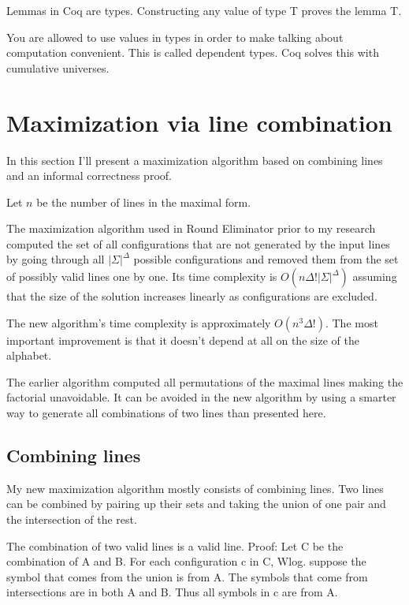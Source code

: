 \documentclass[english, 12pt, a4paper, sci, utf8, a-1b, online]{aaltothesis}
\begin{document}
Lemmas in Coq are types. Constructing any value of type T proves the lemma T.

You are allowed to use values in types in order to make talking about computation convenient. This is called dependent types. Coq solves this with cumulative universes.


\section{Maximization via line combination}

In this section I'll present a maximization algorithm based on combining lines and an informal correctness proof.

Let $n$ be the number of lines in the maximal form.

The maximization algorithm used in Round Eliminator prior to my research computed the set of all configurations that are not generated by the input lines by going through all $|\Sigma|^{\Delta}$ possible configurations and removed them from the set of possibly valid lines one by one. Its time complexity is $O(n\Delta!|\Sigma|^{\Delta})$ assuming that the size of the solution increases linearly as configurations are excluded.

The new algorithm's time complexity is approximately $O(n^{3}\Delta!)$. The most important improvement is that it doesn't depend at all on the size of the alphabet.

The earlier algorithm computed all permutations of the maximal lines making the factorial unavoidable. It can be avoided in the new algorithm by using a smarter way to generate all combinations of two lines than presented here. %

\subsection{Combining lines}

My new maximization algorithm mostly consists of combining lines. Two lines can be combined by pairing up their sets and taking the union of one pair and the intersection of the rest.

The combination of two valid lines is a valid line. Proof: Let C be the combination of A and B. For each configuration c in C, Wlog. suppose the symbol that comes from the union is from A. The symbols that come from intersections are in both A and B. Thus all symbols in c are from A.
\end{document}
